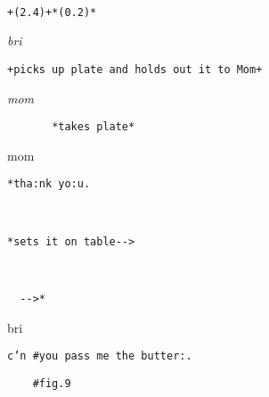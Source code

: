 \documentclass[output=paper,nonflat,modfont,draft]{langsci/langscibook}
\begin{document}

\begin{transbox}{1}{~}
\begin{verbatim}
+(2.4)+*(0.2)*
\end{verbatim}
\end{transbox}

\begin{transbox}{2}{\textit{bri}}
\begin{verbatim}
+picks up plate and holds out it to Mom+
\end{verbatim}
\end{transbox}

\begin{transbox}{3}{\textit{mom}}
\begin{verbatim}
       *takes plate*
\end{verbatim}
\end{transbox}

\begin{transbox}{4}{mom} %
\begin{verbatim}
*tha:nk yo:u.
\end{verbatim}
\end{transbox}

\begin{transbox}{5}{~}
\begin{verbatim}
*sets it on table-->
\end{verbatim}
\end{transbox}


\begin{transbox}{7}{~}
\begin{verbatim}
  -->*
\end{verbatim}
\end{transbox}

\begin{mdframedkendrick}[style=firstfoc]
\begin{transbox}{8}{bri}
\begin{verbatim}
c’n #you pass me the butter:.
\end{verbatim}
\end{transbox}
\end{mdframedkendrick}\vspace{-5mm}

\begin{transbox}{9}{\fig}
\begin{verbatim}
    #fig.9
\end{verbatim}
\end{transbox}
\end{document}
